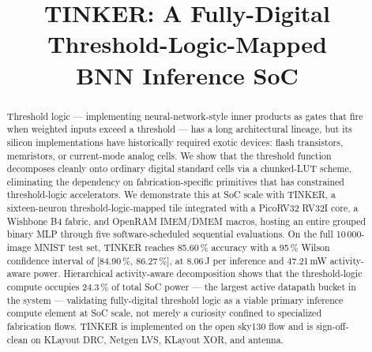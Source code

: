 \documentclass[conference]{IEEEtran}
\begin{document}
\title{TINKER: A Fully-Digital Threshold-Logic-Mapped\\
  BNN Inference SoC}

\author{
  }

\maketitle

\begin{abstract}
  Threshold logic --- implementing neural-network-style inner
  products as gates that fire when weighted inputs exceed a
  threshold --- has a long architectural lineage, but its silicon
  implementations have historically required exotic devices: flash
  transistors, memristors, or current-mode analog cells. We show
  that the threshold function decomposes cleanly onto ordinary
  digital standard cells via a chunked-LUT scheme, eliminating the
  dependency on fabrication-specific primitives that has constrained
  threshold-logic accelerators. We demonstrate this at SoC scale
  with TINKER, a sixteen-neuron threshold-logic-mapped tile
  integrated with a PicoRV32 RV32I core, a Wishbone B4 fabric, and
  OpenRAM IMEM/DMEM macros, hosting an entire grouped binary MLP
  through five software-scheduled sequential evaluations. On the
  full 10\,000-image MNIST test set, TINKER reaches 85.60\,\%
  accuracy with a 95\,\% Wilson confidence interval of
  [84.90\,\%, 86.27\,\%], at 8.06\,\textmu J per inference and
  47.21\,mW activity-aware power. Hierarchical activity-aware
  decomposition shows that the threshold-logic compute occupies
  24.3\,\% of total SoC power --- the largest active datapath
  bucket in the system --- validating fully-digital threshold logic
  as a viable primary inference compute element at SoC scale, not
  merely a curiosity confined to specialized fabrication flows.
  TINKER is implemented on the open sky130 flow and is
  sign-off-clean on KLayout DRC, Netgen LVS, KLayout XOR, and
  antenna.
\end{abstract}
\end{document}
